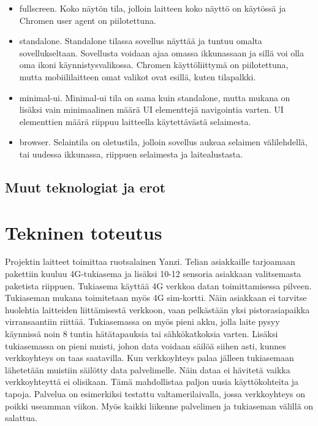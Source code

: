 \documentclass{tktltiki}
\begin{document}
\begin{itemize}
  \item fullscreen. Koko näytön tila, jolloin laitteen koko näyttö on käytössä ja Chromen user agent on piilotettuna.
  \item standalone. Standalone tilassa sovellus näyttää ja tuntuu omalta sovellukseltaan. Sovellusta voidaan ajaa omassa ikkunassaan ja sillä voi olla oma ikoni käynnistysvalikossa. Chromen käyttöliittymä on piilotettuna, mutta mobiililaitteen omat valikot ovat esillä, kuten tilapalkki. 
  \item minimal-ui. Minimal-ui tila on sama kuin standalone, mutta mukana on lisäksi vain minimaalinen määrä UI elementtejä navigointia varten. UI elementtien määrä riippuu laitteella käytettävästä selaimesta. 
  \item browser. Selaintila on oletustila, jolloin sovellus aukeaa selaimen välilehdellä, tai uudessa ikkunassa, riippuen selaimesta ja laitealustasta. 
\end{itemize}


\subsection{Muut teknologiat ja erot}

\newpage
\section{Tekninen toteutus}

Projektin laitteet toimittaa ruotsalainen Yanzi. Telian asiakkaille tarjoamaan pakettiin kuuluu 4G-tukiasema ja lisäksi 10-12 sensoria asiakkaan valitsemasta paketista riippuen. Tukiasema käyttää 4G verkkoa datan toimittamisessa pilveen. Tukiaseman mukana toimitetaan myös 4G sim-kortti. Näin asiakkaan ei tarvitse huolehtia laitteiden liittämisestä verkkoon, vaan pelkästään yksi pistorasiapaikka virransaantiin riittää. Tukiasemassa on myös pieni akku, jolla laite pysyy käynnissä noin 8 tuntia hätätapauksia tai sähkökatkoksia varten. Lisäksi tukiasemassa on pieni muisti, johon data voidaan säilöä siihen asti, kunnes verkkoyhteys on taas saatavilla. Kun verkkoyhteys palaa jälleen tukiasemaan lähetetään muistiin säilötty data palvelimelle. Näin dataa ei hävitetä vaikka verkkoyhteyttä ei olisikaan. Tämä mahdollistaa paljon uusia käyttökohteita ja tapoja. Palvelua on esimerkiksi testattu valtamerilaivalla, jossa verkkoyhteys on poikki useamman viikon. Myös kaikki liikenne palvelimen ja tukiaseman välillä on salattua.
\end{document}
